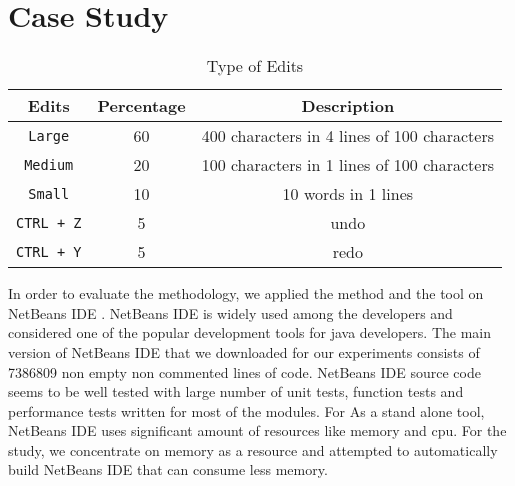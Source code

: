 \section{Case Study}


\begin{table}
\begin{center}
\begin{tabular}{|c| |c| |c|}
\hline
\hline
Edits & Percentage & Description \\
\hline
{\tt Large} & 60 & 400 characters in 4 lines of 100 characters \\
\hline
{\tt Medium} & 20 & 100 characters in 1 lines of 100 characters \\
\hline
{\tt Small} & 10 & 10 words in 1 lines \\
\hline
{\tt CTRL + Z} & 5 & undo \\
\hline
{\tt CTRL + Y} & 5 & redo \\
\hline
\hline
\end{tabular}



\caption{Type of Edits}
\label{tab:edittypes}
\end{center}
\end{table}

In order to evaluate the methodology, we applied the method and the tool on NetBeans IDE \cite{netbeans}. NetBeans IDE is widely used among the developers and considered one of the popular development tools for java developers.  The main version of NetBeans IDE that we downloaded for our experiments consists of 7386809 non empty non commented lines of code. NetBeans IDE source code seems to be well tested with large number of unit tests, function tests and performance tests written for most of the modules. For As a stand alone tool, NetBeans IDE uses significant amount of resources like memory and cpu. For the study, we concentrate on memory as a resource and attempted to automatically build NetBeans IDE that can consume less memory.




